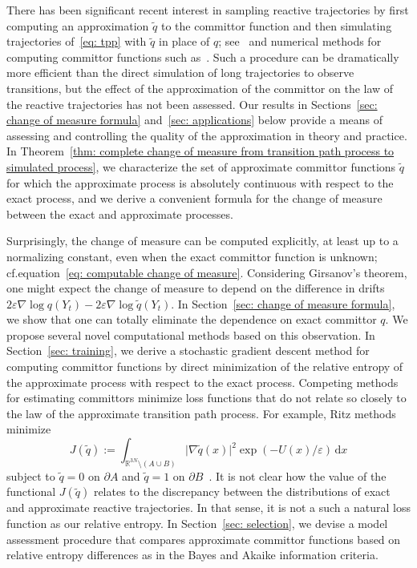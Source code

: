 \documentclass[reqno]{amsart}
\newcommand{\Real}{\mathbb{R}}
\newcommand{\eps}{\varepsilon}
\newcommand{\1}{\mathds{1}}
\renewcommand{\d}{\mathrm{d}}
\newcommand{\grad}{\nabla}
\theoremstyle{definition}
\theoremstyle{remark}
\begin{document}
There has been significant recent interest in sampling reactive trajectories by first computing an approximation $\tilde q$ to the committor function and then simulating trajectories of~\eqref{eq: tpp} with $\tilde q$ in place of $q$; see~\cite{yuan_optimal_2023} and numerical methods for computing committor functions such as~\cite{evans_computing_2022,gao_transition_2023,chen_committor_2023,khoo_solving_2018,li_computing_2019}. Such a procedure can be dramatically more efficient than the direct simulation of long trajectories to observe transitions, but the effect of the approximation of the committor on the law of the reactive trajectories has not been assessed. Our results in Sections~\ref{sec: change of measure formula} and~\ref{sec: applications} below provide a means of assessing and controlling the quality of the approximation in theory and practice. In Theorem~\ref{thm: complete change of measure from transition path process to simulated process}, we characterize the set of approximate committor functions $\tilde q$ for which the approximate process is absolutely continuous with respect to the exact process, and we derive a convenient formula for the change of measure between the exact and approximate processes.

Surprisingly, the change of measure can be computed explicitly, at least up to a normalizing constant, even when the exact committor function is unknown; cf.\@ equation~\eqref{eq: computable change of measure}. Considering Girsanov's theorem, one might expect the change of measure to depend on the difference in drifts $2\eps \grad \log q(Y_t) - 2 \eps \grad \log \tilde q (Y_t)$. In Section~\ref{sec: change of measure formula}, we show that one can totally eliminate the dependence on exact committor $q$. We propose several novel computational methods based on this observation. In Section~\ref{sec: training}, we derive a stochastic gradient descent method for computing committor functions by direct minimization of the relative entropy of the approximate process with respect to the exact process. Competing methods for estimating committors minimize loss functions that do not relate so closely to the law of the approximate transition path process. For example, Ritz methods minimize
\begin{equation*}
  J(\tilde q) := \int_{\Real^{3N} \setminus (A \cup B)} \lvert\grad \tilde q (x) \rvert^2 \exp(-U(x)/\eps) \, \d x
\end{equation*}
subject to $\tilde q=0$ on $\partial A$ and $\tilde q=1$ on $\partial B$~\cite{chen_committor_2023}. It is not clear how the value of the functional $J(\tilde q)$ relates to the discrepancy between the distributions of exact and approximate reactive trajectories. In that sense, it is not a such a natural loss function as our relative entropy. In Section~\ref{sec: selection}, we devise a model assessment procedure that compares approximate committor functions based on relative entropy differences as in the Bayes and Akaike information criteria. 
\end{document}

